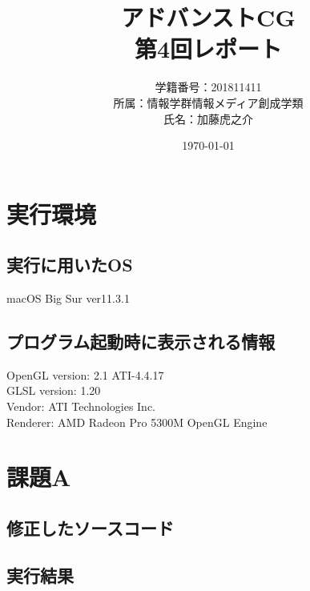\documentclass[a4paper,10pt,uplatex,dvipdfmx]{jsarticle}
\begin{document}
\title{アドバンストCG\\ \huge 第4回レポート}
\author{学籍番号：201811411\\ 所属：情報学群情報メディア創成学類\\ 氏名：加藤虎之介}
\date{\today}
\maketitle

\section{実行環境}
\subsection{実行に用いたOS}
macOS Big Sur ver11.3.1

\subsection{プログラム起動時に表示される情報}
\begin{screen}
  OpenGL version: 2.1 ATI-4.4.17\\
  GLSL version: 1.20\\
  Vendor: ATI Technologies Inc.\\
  Renderer: AMD Radeon Pro 5300M OpenGL Engine
\end{screen}

\section{課題A}
\subsection{修正したソースコード}



\subsection{実行結果}
\end{document}
